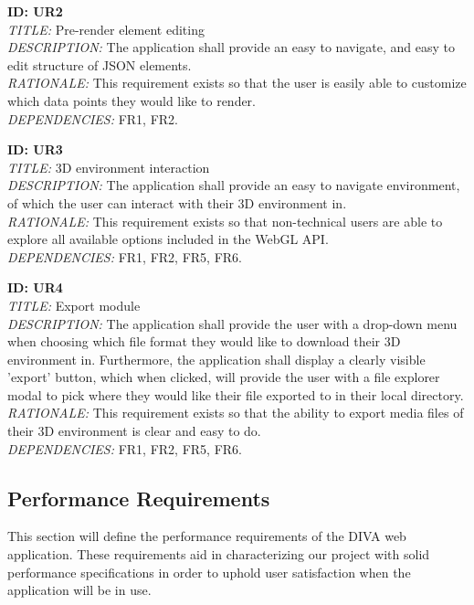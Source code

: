 \documentclass[journal,10pt,onecolumn,compsoc]{IEEEtran} \usepackage[margin=1.0in]{geometry} \usepackage{pdfpages}
\begin{document}
    \noindent \textbf{ID: UR2}\\
    \textit{TITLE:} Pre-render element editing\\
    \textit{DESCRIPTION:} The application shall provide an easy to navigate, and easy to edit structure of JSON elements.\\
    \textit{RATIONALE:} This requirement exists so that the user is easily able to customize which data points they would like to render.\\
    \textit{DEPENDENCIES:}  FR1, FR2.
    \newline
    
    \noindent \textbf{ID: UR3}\\
    \textit{TITLE:} 3D environment interaction\\
    \textit{DESCRIPTION:} The application shall provide an easy to navigate environment, of which the user can interact with their 3D environment in.\\
    \textit{RATIONALE:} This requirement exists so that non-technical users are able to explore all available options included in the WebGL API.\\
    \textit{DEPENDENCIES:}  FR1, FR2, FR5, FR6.
    \newline
    
    \noindent \textbf{ID: UR4}\\
    \textit{TITLE:} Export module\\
    \textit{DESCRIPTION:} The application shall provide the user with a drop-down menu when choosing which file format they would like to download their 3D environment in. Furthermore, the application shall display a clearly visible 'export' button, which when clicked, will provide the user with a file explorer modal to pick where they would like their file exported to in their local directory. \\
    \textit{RATIONALE:} This requirement exists so that the ability to export media files of their 3D environment is clear and easy to do. \\
    \textit{DEPENDENCIES:} FR1, FR2, FR5, FR6.
    \newline

    \subsection{Performance Requirements}
    This section will define the performance requirements of the DIVA web application. These requirements aid in characterizing our project with solid performance specifications in order to uphold user satisfaction when the application will be in use. \\
\end{document}
